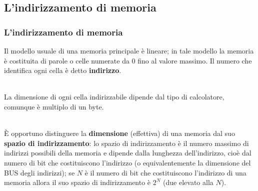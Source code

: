 \subsection[L'indirizzamento di memoria]{L'indirizzamento di memoria}
\begin{frame}
	\frametitle{L'indirizzamento di memoria}
	  
	\begin{block}{}
	
		Il modello usuale di una memoria principale è lineare; in tale modello la memoria è costituita di parole o celle numerate da 0 fino al valore massimo. Il numero che identifica ogni cella è detto \textbf{indirizzo}.\\~\\ \pause
	
		La dimensione di ogni cella indirizzabile dipende dal tipo di calcolatore, comunque è multiplo di un byte.\\~\\ \pause
		
		È opportuno distinguere la \textbf{dimensione} (effettiva) di una memoria dal suo \textbf{spazio di indirizzamento}: lo spazio di indirizzamento è il numero massimo di indirizzi possibili della memoria e dipende dalla lunghezza dell'indirizzo, cioè dal numero di bit che costituiscono l'indirizzo (o equivalentemente la dimensione del BUS degli indirizzi); se $N$ è il numero di bit che costituiscono l'indirizzo di una memoria allora il suo spazio di indirizzamento è $2^N$ (due elevato alla $N$).
		
	\end{block}
\end{frame}



